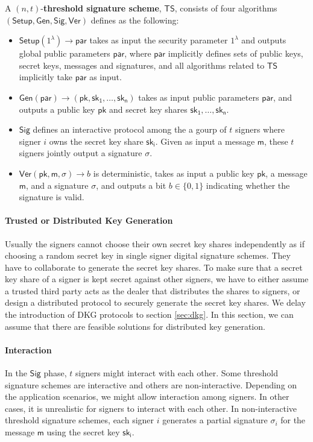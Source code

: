 \begin{definition}
    A $(n, t)$-\textbf{threshold signature scheme}, $\mathsf{TS}$, consists of four algorithms $(\mathsf{Setup, Gen, Sig, Ver})$ defines as the following:
    \begin{itemize}
        \item $\mathsf{Setup}(1^\lambda)\to \mathsf{par}$ takes as input the security parameter $1^\lambda$ and outputs global public parameters $\mathsf{par}$, where $\mathsf{par}$ implicitly defines sets of public keys, secret keys, messages and signatures, and all algorithms related to $\mathsf{TS}$ implicitly take $\mathsf{par}$ as input. 
        \item $\mathsf{Gen(par)}\to (\mathsf{pk, sk_1,\dots, sk_n})$ takes as input public parameters $\mathsf{par}$, and outputs a public key $\mathsf{pk}$ and secret key shares $\mathsf{sk_1, \dots, sk_n}$. 
        \item $\mathsf{Sig}$ defines an interactive protocol among the a gourp of $t$ signers where signer $i$ owns the secret key share $\mathsf{sk_i}$. Given as input a message $\mathsf{m}$, these $t$ signers jointly output a signature $\sigma$. 
        \item $\mathsf{Ver}(\mathsf{pk}, \mathsf{m}, \sigma)\to b$ is deterministic, takes as input a public key $\mathsf{pk}$, a message $\mathsf{m}$, and a signature $\sigma$, and outputs a bit $b\in\{0,1\}$ indicating whether the signature is valid. 
    \end{itemize}
\end{definition}

\paragraph{Trusted or Distributed Key Generation} Usually the signers cannot choose their own secret key shares independently as if choosing a random secret key in single signer digital signature schemes. They have to collaborate to generate the secret key shares. To make sure that a secret key share of a signer is kept secret against other signers, we have to either assume a trusted third party acts as the dealer that distributes the shares to signers, or design a distributed protocol to securely generate the secret key shares. We delay the introduction of DKG protocols to section \ref{sec:dkg}. In this section, we can assume that there are feasible solutions for distributed key generation.  

\paragraph{Interaction} In the $\mathsf{Sig}$ phase, $t$ signers might interact with each other. Some threshold signature schemes are interactive and others are non-interactive. Depending on the application scenarios, we might allow interaction among signers. In other cases, it is unrealistic for signers to interact with each other. In non-interactive threshold signature schemes, each signer $i$ generates a partial signature $\sigma_i$ for the message $\mathsf{m}$ using the secret key $\mathsf{sk_i}$. 

